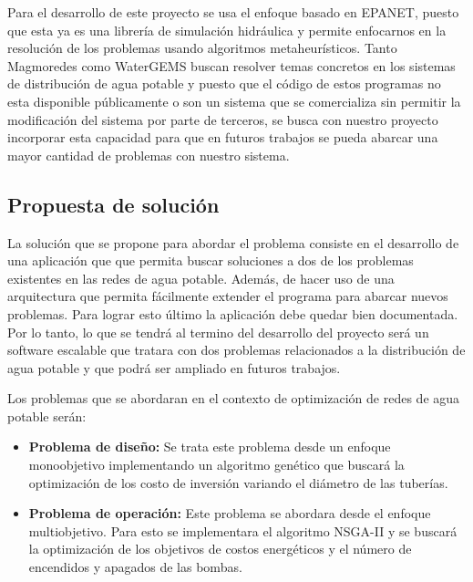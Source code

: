 \documentclass[11pt,letterpaper]{article}
\begin{document}
Para el desarrollo de este proyecto se usa el enfoque basado en EPANET, puesto que esta ya es una librería de simulación hidráulica y permite enfocarnos en la resolución de los problemas usando algoritmos metaheurísticos. Tanto Magmoredes como WaterGEMS buscan resolver temas concretos en los sistemas de distribución de agua potable y puesto que el código de estos programas no esta disponible públicamente o son un sistema que se comercializa sin permitir la modificación del sistema por parte de terceros, se busca con nuestro proyecto incorporar esta capacidad para que en futuros trabajos se pueda abarcar una mayor cantidad de problemas con nuestro sistema.

\subsection{Propuesta de solución}


La solución que se propone para abordar el problema consiste en el desarrollo de una aplicación que 
que permita buscar soluciones a dos de los problemas existentes en las redes de agua potable. Además, de hacer uso de una arquitectura que permita fácilmente extender el programa para abarcar nuevos problemas. Para lograr esto último la aplicación debe quedar bien documentada. Por lo tanto, lo que se tendrá al termino del desarrollo del proyecto será un software escalable que tratara con dos problemas relacionados a la distribución de agua potable y que podrá ser ampliado en futuros trabajos.

Los problemas que se abordaran en el contexto de optimización de redes de agua potable serán:
\begin{itemize}
	\item \textbf{Problema de diseño:} Se trata este problema desde un enfoque monoobjetivo implementando un algoritmo genético que buscará la optimización de los costo de inversión variando el diámetro de las tuberías. 
	\item \textbf{Problema de operación:} Este problema se abordara desde el enfoque multiobjetivo. Para esto se implementara el algoritmo NSGA-II y se buscará la optimización de los objetivos de costos energéticos y el número de encendidos y apagados de las bombas.
\end{itemize}
\end{document}
